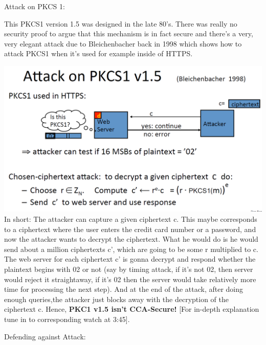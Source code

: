 \documentclass[11pt]{article}
\makeatletter
\def\maxwidth{\ifdim\Gin@nat@width>\linewidth\linewidth
    \else\Gin@nat@width\fi}
\let\Oldincludegraphics\includegraphics
\renewcommand{\includegraphics}[1]{\Oldincludegraphics[width=.8\maxwidth]{#1}}
\makeatother
\begin{document}
Attack on PKCS 1:

This PKCS1 version 1.5 was designed in the late 80's. There was really
no security proof to argue that this mechanism is in fact secure and
there's a very, very elegant attack due to Bleichenbacher back in 1998
which shows how to attack PKCS1 when it's used for example inside of
HTTPS.

\includegraphics{./Images/AttackPKCS1.png} In short: The attacker can
capture a given ciphertext c. This maybe corresponds to a ciphertext
where the user enters the credit card number or a password, and now the
attacker wants to decrypt the ciphertext. What he would do is he would
send about a million ciphertexts c', which are going to be some r
multiplied to c. The web server for each ciphertext c' is gonna decrypt
and respond whether the plaintext begins with 02 or not (say by timing
attack, if it's not 02, then server would reject it straightaway, if
it's 02 then the server would take relatively more time for processing
the next step). And at the end of the attack, after doing enough
queries,the attacker just blocks away with the decryption of the
ciphertext c. Hence, \textbf{PKC1 v1.5 isn't CCA-Secure!} {[}For
in-depth explanation tune in to corresponding watch at 3:45{]}.

Defending against Attack:
\end{document}
